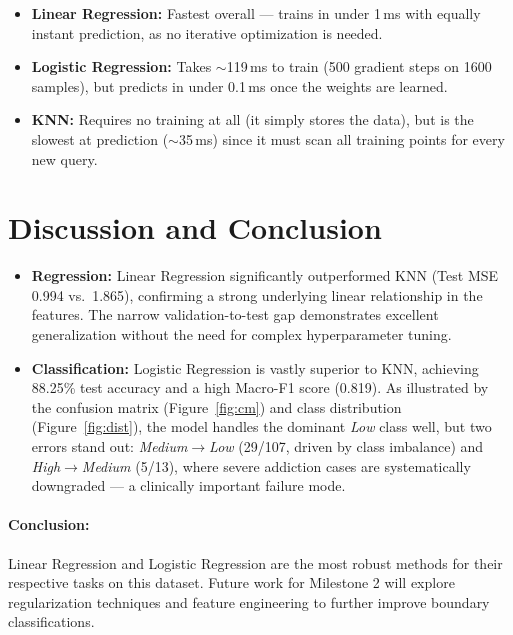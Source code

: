 \documentclass[10pt, twocolumn, letterpaper]{article}
\begin{document}
\begin{itemize}[noitemsep, leftmargin=*]
    \item \textbf{Linear Regression:} Fastest overall — trains in under 1\,ms with equally instant prediction, as no iterative optimization is needed.
    \item \textbf{Logistic Regression:} Takes $\sim$119\,ms to train (500 gradient steps on 1600 samples), but predicts in under 0.1\,ms once the weights are learned.
    \item \textbf{KNN:} Requires no training at all (it simply stores the data), but is the slowest at prediction ($\sim$35\,ms) since it must scan all training points for every new query.
\end{itemize}

\section{Discussion and Conclusion}
\begin{itemize}[leftmargin=*]
    \item \textbf{Regression:} Linear Regression significantly outperformed KNN (Test MSE 0.994 vs.\ 1.865), confirming a strong underlying linear relationship in the features. The narrow validation-to-test gap demonstrates excellent generalization without the need for complex hyperparameter tuning.
    \item \textbf{Classification:} Logistic Regression is vastly superior to KNN, achieving 88.25\% test accuracy and a high Macro-F1 score (0.819). As illustrated by the confusion matrix (Figure~\ref{fig:cm}) and class distribution (Figure~\ref{fig:dist}), the model handles the dominant \emph{Low} class well, but two errors stand out: \emph{Medium}$\to$\emph{Low} (29/107, driven by class imbalance) and \emph{High}$\to$\emph{Medium} (5/13), where severe addiction cases are systematically downgraded — a clinically important failure mode.
\end{itemize}

\paragraph{Conclusion:} Linear Regression and Logistic Regression are the most robust methods for their respective tasks on this dataset. Future work for Milestone 2 will explore regularization techniques and feature engineering to further improve boundary classifications.
\end{document}
